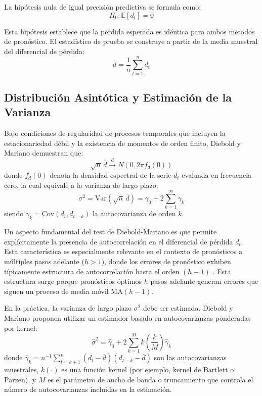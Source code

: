 La hipótesis nula de igual precisión predictiva se formula como:
\begin{equation}
H_0: \mathbb{E}[d_t] = 0
\label{eq:dm_null}
\end{equation}

Esta hipótesis establece que la pérdida esperada es idéntica para ambos métodos de pronóstico. El estadístico de prueba se construye a partir de la media muestral del diferencial de pérdida:
\begin{equation}
\bar{d} = \frac{1}{n}\sum_{t=1}^n d_t
\end{equation}

\subsection{Distribución Asintótica y Estimación de la Varianza}

Bajo condiciones de regularidad de procesos temporales que incluyen la estacionariedad débil y la existencia de momentos de orden finito, Diebold y Mariano demuestran que:
\begin{equation}
\sqrt{n}\,\bar{d} \xrightarrow{d} N(0, 2\pi f_d(0))
\end{equation}
donde $f_d(0)$ denota la densidad espectral de la serie $d_t$ evaluada en frecuencia cero, la cual equivale a la varianza de largo plazo:
\begin{equation}
\sigma^2 = \text{Var}(\sqrt{n}\,\bar{d}) = \gamma_0 + 2\sum_{k=1}^\infty \gamma_k
\label{eq:long_run_variance}
\end{equation}
siendo $\gamma_k = \text{Cov}(d_t, d_{t-k})$ la autocovarianza de orden $k$.

Un aspecto fundamental del test de Diebold-Mariano es que permite explícitamente la presencia de autocorrelación en el diferencial de pérdida $d_t$. Esta característica es especialmente relevante en el contexto de pronósticos a múltiples pasos adelante ($h > 1$), donde los errores de pronóstico exhiben típicamente estructura de autocorrelación hasta el orden $(h-1)$ \parencite{DieboldMariano1995}. Esta estructura surge porque pronósticos óptimos $h$ pasos adelante generan errores que siguen un proceso de media móvil MA$(h-1)$.

En la práctica, la varianza de largo plazo $\sigma^2$ debe ser estimada. Diebold y Mariano proponen utilizar un estimador basado en autocovarianzas ponderadas por kernel:
\begin{equation}
\hat{\sigma}^2 = \hat{\gamma}_0 + 2\sum_{k=1}^{M} k\left(\frac{k}{M}\right)\hat{\gamma}_k
\label{eq:kernel_variance_estimator}
\end{equation}
donde $\hat{\gamma}_k = n^{-1}\sum_{t=k+1}^n (d_t - \bar{d})(d_{t-k} - \bar{d})$ son las autocovarianzas muestrales, $k(\cdot)$ es una función kernel (por ejemplo, kernel de Bartlett o Parzen), y $M$ es el parámetro de ancho de banda o truncamiento que controla el número de autocovarianzas incluidas en la estimación.

